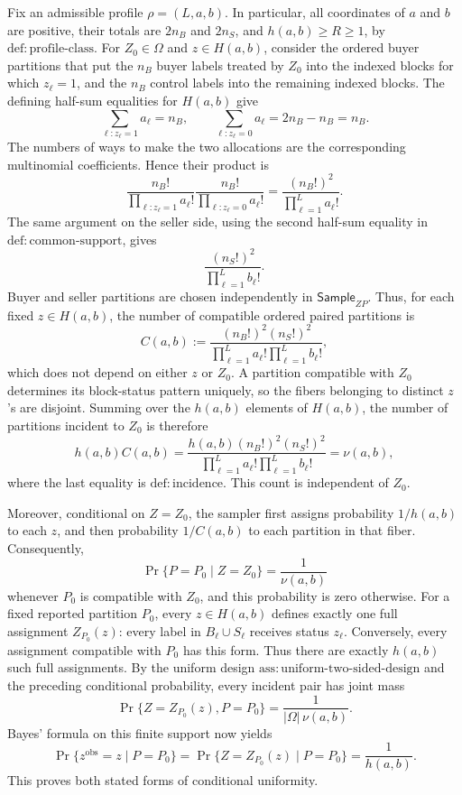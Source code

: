 Fix an admissible profile \(\rho=(L,a,b)\).  In particular, all coordinates of \(a\) and \(b\) are positive, their totals are \(2n_B\) and \(2n_S\), and \(h(a,b)\ge R\ge1\), by \(\mathrm{def{:}profile\mbox{-}class}\).  For \(Z_0\in\Omega\) and \(z\in H(a,b)\), consider the ordered buyer partitions that put the \(n_B\) buyer labels treated by \(Z_0\) into the indexed blocks for which \(z_\ell=1\), and the \(n_B\) control labels into the remaining indexed blocks.  The defining half-sum equalities for \(H(a,b)\) give
\[
 \sum_{\ell:z_\ell=1}a_\ell=n_B,
 \qquad
 \sum_{\ell:z_\ell=0}a_\ell
 =2n_B-n_B=n_B.
\]
The numbers of ways to make the two allocations are the corresponding multinomial coefficients.  Hence their product is
\[
 \frac{n_B!}{\prod_{\ell:z_\ell=1}a_\ell!}
 \frac{n_B!}{\prod_{\ell:z_\ell=0}a_\ell!}
 =\frac{(n_B!)^2}{\prod_{\ell=1}^{L}a_\ell!}.
\]
The same argument on the seller side, using the second half-sum equality in \(\mathrm{def{:}common\mbox{-}support}\), gives
\[
 \frac{(n_S!)^2}{\prod_{\ell=1}^{L}b_\ell!}.
\]
Buyer and seller partitions are chosen independently in \(\mathsf{Sample}_{ZP}\).  Thus, for each fixed \(z\in H(a,b)\), the number of compatible ordered paired partitions is
\[
 C(a,b):=
 \frac{(n_B!)^2(n_S!)^2}
 {\prod_{\ell=1}^{L}a_\ell!\prod_{\ell=1}^{L}b_\ell!},
\]
which does not depend on either \(z\) or \(Z_0\).  A partition compatible with \(Z_0\) determines its block-status pattern uniquely, so the fibers belonging to distinct \(z\)'s are disjoint.  Summing over the \(h(a,b)\) elements of \(H(a,b)\), the number of partitions incident to \(Z_0\) is therefore
\[
 h(a,b)C(a,b)
 =\frac{h(a,b)(n_B!)^2(n_S!)^2}
 {\prod_{\ell=1}^{L}a_\ell!\prod_{\ell=1}^{L}b_\ell!}
 =\nu(a,b),
\]
where the last equality is \(\mathrm{def{:}incidence}\).  This count is independent of \(Z_0\).

Moreover, conditional on \(Z=Z_0\), the sampler first assigns probability \(1/h(a,b)\) to each \(z\), and then probability \(1/C(a,b)\) to each partition in that fiber.  Consequently,
\[
 \Pr\{P=P_0\mid Z=Z_0\}
 =\frac{1}{\nu(a,b)}
\]
whenever \(P_0\) is compatible with \(Z_0\), and this probability is zero otherwise.  For a fixed reported partition \(P_0\), every \(z\in H(a,b)\) defines exactly one full assignment \(Z_{P_0}(z)\): every label in \(B_\ell\cup S_\ell\) receives status \(z_\ell\).  Conversely, every assignment compatible with \(P_0\) has this form.  Thus there are exactly \(h(a,b)\) such full assignments.  By the uniform design \(\mathrm{ass{:}uniform\mbox{-}two\mbox{-}sided\mbox{-}design}\) and the preceding conditional probability, every incident pair has joint mass
\[
 \Pr\{Z=Z_{P_0}(z),P=P_0\}
 =\frac{1}{|\Omega|\,\nu(a,b)}.
\]
Bayes' formula on this finite support now yields
\[
 \Pr\{z^{\mathrm{obs}}=z\mid P=P_0\}
 =\Pr\{Z=Z_{P_0}(z)\mid P=P_0\}
 =\frac1{h(a,b)}.
\]
This proves both stated forms of conditional uniformity.


